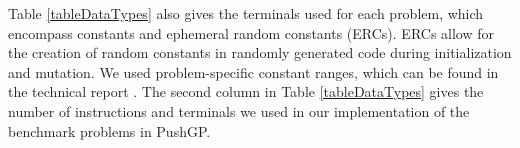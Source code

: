 \documentclass{sig-alternate}
\begin{document}
Table \ref{tableDataTypes} also gives the terminals used for each problem, which encompass constants and ephemeral random constants (ERCs). ERCs allow for the creation of random constants in randomly generated code during initialization and mutation. We used problem-specific constant ranges, which can be found in the technical report \cite{helmuth:umass:tr}.
The second column in Table \ref{tableDataTypes} gives the number of instructions and terminals we used in our implementation of the benchmark problems in PushGP. 
\end{document}
